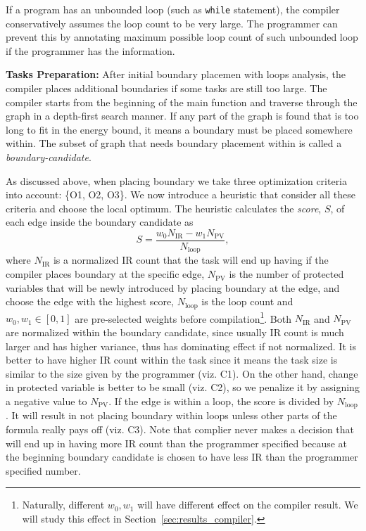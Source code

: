 If a program has an unbounded loop (such as {\tt while} statement), the compiler conservatively assumes the loop count to be very large. The programmer can prevent this by annotating maximum possible loop count of such unbounded loop if the programmer has the information.

\textbf{Tasks Preparation:} After initial boundary placemen with loops analysis, the compiler places additional boundaries if some tasks are still too large. The \sys compiler starts from the beginning of the main function and traverse through the graph in a depth-first search manner. If any part of the graph is found that is too long to fit in the energy bound, it means a boundary must be placed somewhere within. The subset of graph that needs boundary placement within is called a {\em boundary-candidate}.

As discussed above, when placing boundary we take three optimization criteria into account: \{O1, O2, O3\}. We now introduce a heuristic that consider all these criteria and choose the local optimum. The heuristic calculates the {\em score}, $S$, of each edge inside the boundary candidate as
%
\begin{equation}
S = \frac{w_{0} N_{\text{IR}} - w_{1} N_{\text{PV}}}{N_{\text{loop}}},\nonumber
\end{equation}
%
where $N_{\text{IR}}$ is a normalized IR count that the task will end up having if the compiler places boundary at the specific edge, $N_{\text{PV}}$ is the number of protected variables that will be newly introduced by placing boundary at the edge, and choose the edge with the highest score, $N_{\text{loop}}$ is the loop count and $w_{0},w_{1}\in [0,1]$ are pre-selected weights before compilation\footnote{Naturally, different $w_{0}, w_{1}$ will have different effect on the compiler result. We will study this effect in Section~\ref{sec:results_compiler}.}. Both $N_{\text{IR}}$ and $N_{\text{PV}}$ are normalized within the boundary candidate, since usually IR count is much larger and has higher variance, thus has dominating effect if not normalized. It is better to have higher IR count within the task since it means the task size is similar to the size given by the programmer (viz. C1). On the other hand, change in protected variable is better to be small (viz. C2), so we penalize it by assigning a negative value to $N_{\text{PV}}$. If the edge is within a loop, the score is divided by $N_{\text{loop}}$. It will result in not placing boundary within loops unless other parts of the formula really pays off (viz. C3). Note that complier never makes a decision that will end up in having more IR count than the programmer specified because at the beginning boundary candidate is chosen to have less IR than the programmer specified number.

